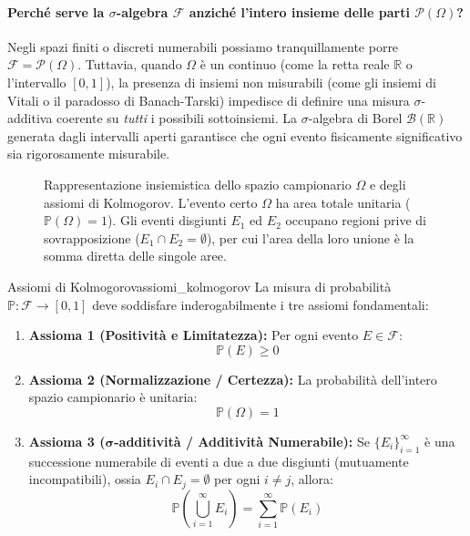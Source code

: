 \paragraph{Perché serve la $\sigma$-algebra $\mathcal{F}$ anziché l'intero insieme delle parti $\mathcal{P}(\Omega)$?}
Negli spazi finiti o discreti numerabili possiamo tranquillamente porre $\mathcal{F} = \mathcal{P}(\Omega)$. Tuttavia, quando $\Omega$ è un continuo (come la retta reale $\mathbb{R}$ o l'intervallo $[0,1]$), la presenza di insiemi non misurabili (come gli insiemi di Vitali o il paradosso di Banach-Tarski) impedisce di definire una misura $\sigma$-additiva coerente su \emph{tutti} i possibili sottoinsiemi. La $\sigma$-algebra di Borel $\mathcal{B}(\mathbb{R})$ generata dagli intervalli aperti garantisce che ogni evento fisicamente significativo sia rigorosamente misurabile.

\begin{figure}[htbp]
\centering

\caption{Rappresentazione insiemistica dello spazio campionario $\Omega$ e degli assiomi di Kolmogorov. L'evento certo $\Omega$ ha area totale unitaria ($\mathbb{P}(\Omega) = 1$). Gli eventi disgiunti $E_1$ ed $E_2$ occupano regioni prive di sovrapposizione ($E_1 \cap E_2 = \emptyset$), per cui l'area della loro unione è la somma diretta delle singole aree.}
\label{fig:diagramma_venn_assiomi}
\end{figure}

\begin{teorema}{Assiomi di Kolmogorov}{assiomi_kolmogorov}
La misura di probabilità $\mathbb{P}: \mathcal{F} \to [0, 1]$ deve soddisfare inderogabilmente i tre assiomi fondamentali:
\begin{enumerate}
    \item \textbf{Assioma 1 (Positività e Limitatezza):} Per ogni evento $E \in \mathcal{F}$:
    \begin{equation}
        \mathbb{P}(E) \ge 0
    \end{equation}
    \item \textbf{Assioma 2 (Normalizzazione / Certezza):} La probabilità dell'intero spazio campionario è unitaria:
    \begin{equation}
        \mathbb{P}(\Omega) = 1
    \end{equation}
    \item \textbf{Assioma 3 ($\bm{\sigma}$-additività / Additività Numerabile):} Se $\{E_i\}_{i=1}^\infty$ è una successione numerabile di eventi a due a due disgiunti (mutuamente incompatibili), ossia $E_i \cap E_j = \emptyset$ per ogni $i \neq j$, allora:
    \begin{equation}
        \mathbb{P}\left(\bigcup_{i=1}^\infty E_i\right) = \sum_{i=1}^\infty \mathbb{P}(E_i)
    \end{equation}
\end{enumerate}
\end{teorema}


